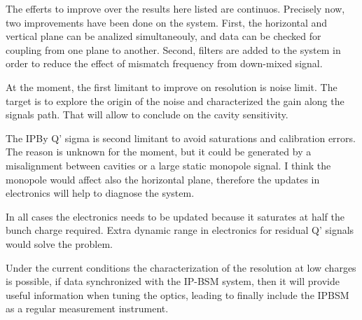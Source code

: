 The efferts to improve over the results here listed are continuos. Precisely now, two improvements have been done on the system. First, the horizontal and vertical plane can be analized simultaneouly, and data can be checked for coupling from one plane to another. Second, filters are added to the system in order to reduce the effect of mismatch frequency from down-mixed signal.\par
At the moment, the first limitant to improve on resolution is noise limit. The target is to explore the origin of the noise and characterized the gain along the signals path. That will allow to conclude on the cavity sensitivity.\par
The IPBy Q' sigma is second limitant to avoid saturations and calibration errors. The reason is unknown for the moment, but it could be generated by a misalignment between cavities or a large static monopole signal. I think the monopole would affect also the horizontal plane, therefore the updates in electronics will help to diagnose the system.\par
In all cases the electronics needs to be updated because it saturates at half the bunch charge required. Extra dynamic range in electronics for residual Q' signals would solve the problem.\par
Under the current conditions the characterization of the resolution at low charges is possible, if data synchronized with the IP-BSM system, then it will provide useful information when tuning the optics, leading to finally include the IPBSM as a regular measurement instrument.\par
